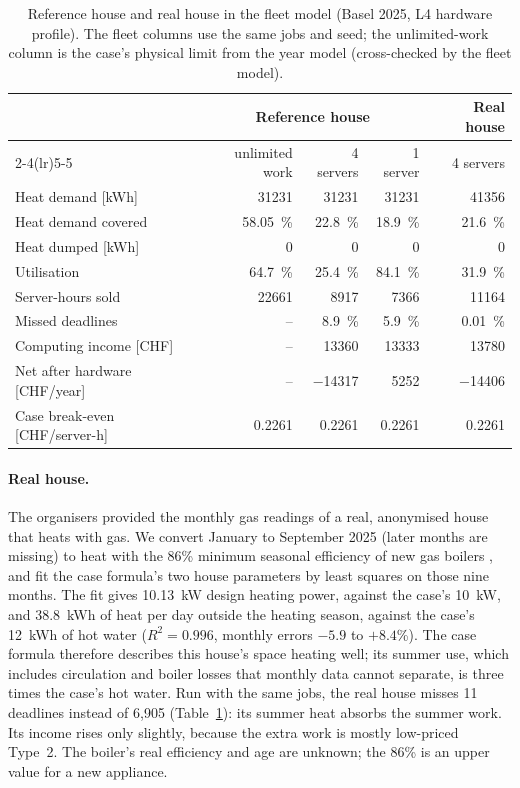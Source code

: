 \begin{table}[ht]
  \centering
  \caption{Reference house and real house in the fleet model (Basel 2025, L4 hardware profile). The
    fleet columns use the same jobs and seed; the unlimited-work column is the case's physical
    limit from the year model (cross-checked by the fleet model).}
  \label{tab:house-fleet}
  \small
  \setlength{\tabcolsep}{4pt}
  \begin{tabular}{lrrrr}
    \toprule
    & \multicolumn{3}{c}{Reference house} & Real house \\
    \cmidrule(lr){2-4}\cmidrule(lr){5-5}
    & unlimited work & 4 servers & 1 server & 4 servers \\
    \midrule
    Heat demand [kWh] & \num{31231} & \num{31231} & \num{31231} & \num{41356} \\
    Heat demand covered & \qty{58.05}{\percent} & \qty{22.8}{\percent} & \qty{18.9}{\percent} & \qty{21.6}{\percent} \\
    Heat dumped [kWh] & 0 & 0 & 0 & 0 \\
    Utilisation & \qty{64.7}{\percent} & \qty{25.4}{\percent} & \qty{84.1}{\percent} & \qty{31.9}{\percent} \\
    Server-hours sold & \num{22661} & \num{8917} & \num{7366} & \num{11164} \\
    Missed deadlines & -- & \qty{8.9}{\percent} & \qty{5.9}{\percent} & \qty{0.01}{\percent} \\
    Computing income [CHF] & -- & \num{13360} & \num{13333} & \num{13780} \\
    Net after hardware [CHF/year] & -- & \num{-14317} & \num{5252} & \num{-14406} \\
    Case break-even [CHF/server-h] & 0.2261 & 0.2261 & 0.2261 & 0.2261 \\
    \bottomrule
  \end{tabular}
\end{table}

\paragraph{Real house.} The organisers provided the monthly gas readings of a real, anonymised
house that heats with gas. We convert January to September 2025 (later months are missing) to heat
with the 86\% minimum seasonal efficiency of new gas boilers \cite{eu813}, and fit the case
formula's two house parameters by least squares on those nine months. The fit gives
\qty{10.13}{kW} design heating power, against the case's \qty{10}{kW}, and \qty{38.8}{kWh} of heat
per day outside the heating season, against the case's \qty{12}{kWh} of hot water ($R^2 = 0.996$,
monthly errors $-5.9$ to $+8.4$\%). The case formula therefore describes this house's space heating
well; its summer use, which includes circulation and boiler losses that monthly data cannot
separate, is three times the case's hot water. Run with the same jobs, the real house misses 11
deadlines instead of 6,905 (Table~\ref{tab:house-fleet}): its summer heat absorbs the summer work.
Its income rises only slightly, because the extra work is mostly low-priced Type~2. The boiler's
real efficiency and age are unknown; the 86\% is an upper value for a new appliance.

